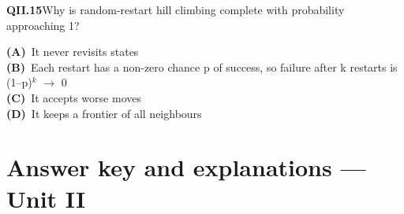 \documentclass[11pt]{article}
\begin{document}
\begin{tcolorbox}[enhanced,breakable,colback=white,colframe=navyL,arc=2mm,boxrule=0.7pt,left=3mm,right=3mm,top=2mm,bottom=2mm]
\textbf{\color{navy}QII.15}\quad Why is random-restart hill climbing complete with probability approaching 1?\hfill{}\par\smallskip
{\small \textbf{\color{navyL}(A)}\ It never revisits states\\[1pt]\textbf{\color{navyL}(B)}\ Each restart has a non-zero chance p of success, so failure after k restarts is (1--p)$^k$ $\to$ 0\\[1pt]\textbf{\color{navyL}(C)}\ It accepts worse moves\\[1pt]\textbf{\color{navyL}(D)}\ It keeps a frontier of all neighbours}
\end{tcolorbox}
\newpage
\section*{Answer key and explanations --- Unit II}
\end{document}
